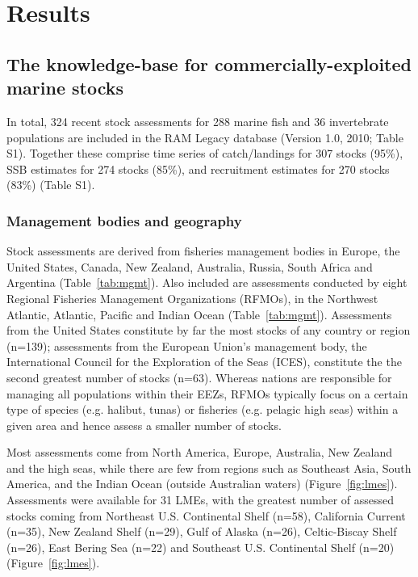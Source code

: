 \newpage
\section*{Results}


\subsection*{The knowledge-base for commercially-exploited marine stocks}
In total, 324 recent stock assessments for
288 marine fish and 36
invertebrate populations are included in the RAM Legacy database
(Version 1.0, 2010; Table S1). Together these comprise time series of
catch/landings for 307 stocks (95\%),
SSB estimates for 274 stocks (85\%), and recruitment estimates for
270 stocks (83\%) (Table S1).

\subsubsection*{Management bodies and geography}
Stock assessments are derived from fisheries management bodies in
Europe, the United States, Canada, New Zealand, Australia, Russia,
South Africa and Argentina (Table~\ref{tab:mgmt}). Also included are
assessments conducted by eight Regional Fisheries Management
Organizations (RFMOs), in the Northwest Atlantic, Atlantic, Pacific
and Indian Ocean (Table~\ref{tab:mgmt}). Assessments from the United
States constitute by far the most stocks of any country or region
(n=139); assessments from the European Union's
management body, the International Council for the Exploration of the
Seas (ICES), constitute the the second greatest number of stocks
(n=63).  Whereas nations are responsible for
managing all populations within their EEZs, RFMOs typically focus on a
certain type of species (e.g.  halibut, tunas) or fisheries (e.g.
pelagic high seas) within a given area and hence assess a smaller
number of stocks.

Most assessments come from North America, Europe, Australia, New
Zealand and the high seas, while there are few from regions such as
Southeast Asia, South America, and the Indian Ocean (outside
Australian waters) (Figure~\ref{fig:lmes}). Assessments were available for 31 LMEs, with the greatest number of
assessed stocks coming from Northeast U.S. Continental Shelf (n=58),
California Current (n=35), New Zealand Shelf (n=29),
Gulf of Alaska (n=26), Celtic-Biscay Shelf (n=26), East Bering Sea (n=22)
and Southeast U.S. Continental Shelf (n=20) (Figure~\ref{fig:lmes}).

